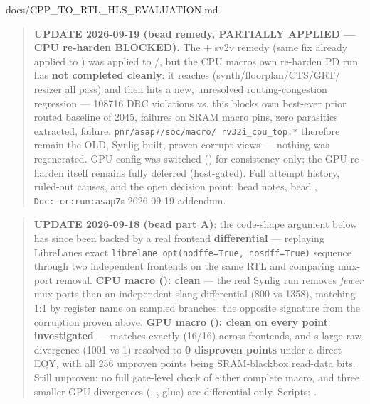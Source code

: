 \begin{relocated}{docs/CPP_TO_RTL_HLS_EVALUATION.md}
\begin{quote}
\bad{} \textbf{UPDATE 2026-09-19 (bead  remedy, PARTIALLY
APPLIED --- CPU re-harden BLOCKED).} The  + sv2v
remedy (same fix already applied to ) was applied to
/, but the CPU
macro\textquotesingle s own re-harden PD run has \textbf{not completed
cleanly}: it reaches 
(synth/\allowbreak{}floorplan/\allowbreak{}CTS/\allowbreak{}GRT/ resizer
all pass) and then hits a new, unresolved routing-congestion regression
--- 108716 DRC violations vs. this block\textquotesingle s own best-ever
prior routed baseline of 2045,  failures on SRAM macro
pins, zero parasitics extracted,  failure.
\texttt{pnr/\allowbreak{}asap7/\allowbreak{}soc/\allowbreak{}macro/\allowbreak{}\ rv32i\_\allowbreak{}cpu\_\allowbreak{}top.\allowbreak{}*}
therefore remain the OLD, Synlig-built, proven-corrupt views --- nothing
was regenerated. GPU config was switched () for
consistency only; the GPU re-harden itself remains fully deferred
(host-gated). Full attempt history, ruled-out causes, and the open
decision point: bead  notes, bead
,
\texttt{Doc:\allowbreak{}\ cr:\allowbreak{}run:\allowbreak{}asap7}\textquotesingle s
2026-09-19 addendum.
\end{quote}

\begin{quote}
\ok{} \textbf{UPDATE 2026-09-18 (bead  part A)}: the
code-shape argument below has since been backed by a real frontend
\textbf{differential} --- replaying LibreLane\textquotesingle s exact
\texttt{librelane\_\allowbreak{}opt(nodffe=\allowbreak{}True,\allowbreak{}\ nosdff=\allowbreak{}True)}
sequence through two independent frontends on the same RTL and comparing
mux-port removal. \textbf{CPU macro (): clean} ---
the real Synlig run removes \emph{fewer} mux ports than an independent
slang differential (800 vs 1358), matching 1:1 by register name on
sampled branches: the opposite signature from the corruption proven
above. \textbf{GPU macro (): clean on every point
investigated} ---  matches exactly (16/16) across
frontends, and \textquotesingle s large raw
divergence (1001 vs 1) resolved to \textbf{0 disproven points} under a
direct EQY, with all 256 unproven points being SRAM-blackbox read-data
bits. Still unproven: no full gate-level check of either complete macro,
and three smaller GPU divergences (,
,  glue) are differential-only.
Scripts: .
\end{quote}


\end{relocated}
